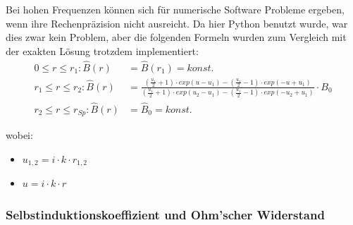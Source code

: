 Bei hohen Frequenzen k\"onnen sich f\"ur numerische Software Probleme ergeben,
wenn ihre Rechenpr\"azision nicht ausreicht. Da hier Python benutzt wurde, war
dies zwar  kein Problem, aber die  folgenden Formeln wurden zum  Vergleich mit
der exakten L\"osung trotzdem implementiert:
\vspace{-0.5em}
\begin{align}
    \label{eq:hohlzylinder:BApprox2}
    0 \leq r \leq r_1:      \hat{B} (r) & = \hat{B} (r_1) = konst. \\
    r_1 \leq r \leq r_2:    \hat{B} (r) & = \frac{(\frac{u_1}{2} + 1 ) \cdot exp(u - u_1) - (\frac{u_1}{2} - 1 ) \cdot exp(-u+u_1)}{(\frac{u_1}{2} + 1 ) \cdot exp(u_2 - u_1) - (\frac{u_1}{2} - 1 ) \cdot exp(-u_2+u_1)} \cdot B_0  \\
    r_2 \leq r \leq r_{Sp}: \hat{B} (r) & = \hat{B}_0 = konst.
\end{align}

wobei:

\begin{itemize}
    \item[]
        $u_{1,2} = i \cdot k \cdot r_{1,2}$
    \item[]
        $u = i \cdot k \cdot r$
\end{itemize}


\subsubsection{Selbstinduktionskoeffizient und Ohm'scher Widerstand}
\label{sec:arbgru:subsec:hohlzylinder:LRexakt}

